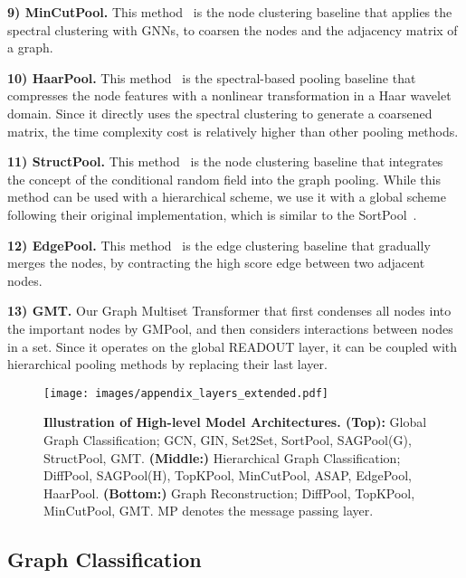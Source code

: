 \textbf{9) MinCutPool.} This method~\citep{MincutPool} is the node clustering baseline that applies the spectral clustering with GNNs, to coarsen the nodes and the adjacency matrix of a graph.

\textbf{10) HaarPool.} This method~\citep{HaarPool} is the spectral-based pooling baseline that compresses the node features with a nonlinear transformation in a Haar wavelet domain. Since it directly uses the spectral clustering to generate a coarsened matrix, the time complexity cost is relatively higher than other pooling methods.

\textbf{11) StructPool.} This method~\citep{StructPool} is the node clustering baseline that integrates the concept of the conditional random field into the graph pooling. While this method can be used with a hierarchical scheme, we use it with a global scheme following their original implementation, which is similar to the SortPool~\citep{SortPool}.

\textbf{12) EdgePool.} This method~\citep{edgepool} is the edge clustering baseline that gradually merges the nodes, by contracting the high score edge between two adjacent nodes. 

\textbf{13) GMT.} Our Graph Multiset Transformer that first condenses all nodes into the important nodes by GMPool, and then considers interactions between nodes in a set. Since it operates on the global READOUT layer, it can be coupled with hierarchical pooling methods by replacing their last layer.

\begin{figure*}[t]
    \centering
    \texttt{[image: images/appendix\_layers\_extended.pdf]}
    \vskip -0.15in
    \caption{\small \textbf{Illustration of High-level Model Architectures. (Top):} Global Graph Classification; GCN, GIN, Set2Set, SortPool, SAGPool(G), StructPool, GMT. \textbf{(Middle:)} Hierarchical Graph Classification; DiffPool, SAGPool(H), TopKPool, MinCutPool, ASAP, EdgePool, HaarPool. \textbf{(Bottom:)} Graph Reconstruction; DiffPool, TopKPool, MinCutPool, GMT. MP denotes the message passing layer.}
    \vskip -0.15in
    \label{fig:appendix/layers}
\end{figure*}

\subsection{Graph Classification}

